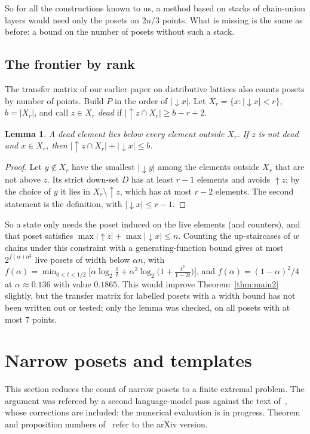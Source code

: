 \documentclass[11pt]{article}
\newtheorem{lemma}[theorem]{Lemma}
\theoremstyle{definition}
\theoremstyle{remark}
\begin{document}
So for all the constructions known to us, a method based on stacks of chain-union layers
would need only the posets on $2n/3$ points. What is missing is the same as before: a bound
on the number of posets without such a stack.

\subsection*{The frontier by rank}

The transfer matrix of our earlier paper on distributive lattices also counts posets by
number of points. Build $P$ in the order of $|{\downarrow}x|$. Let
$X_r=\{x:|{\downarrow}x|<r\}$, $b=|X_r|$, and call $z\in X_r$ \emph{dead} if
$|{\uparrow}z\cap X_r|\ge b-r+2$.

\begin{lemma}
A dead element lies below every element outside $X_r$. If $z$ is not dead and $x\in X_r$,
then $|{\uparrow}z\cap X_r|+|{\downarrow}x|\le b$.
\end{lemma}
\begin{proof}
Let $y\notin X_r$ have the smallest $|{\downarrow}y|$ among the elements outside $X_r$ that
are not above $z$. Its strict down-set $D$ has at least $r-1$ elements and avoids
${\uparrow}z$; by the choice of $y$ it lies in $X_r\setminus{\uparrow}z$, which has at most
$r-2$ elements. The second statement is the definition, with $|{\downarrow}x|\le r-1$.
\end{proof}

So a state only needs the poset induced on the live elements (and counters), and that poset
satisfies $\max|{\uparrow}z|+\max|{\downarrow}x|\le n$. Counting the up-staircases of
$w$ chains under this constraint with a generating-function bound gives at most
$2^{f(\alpha)n^2}$ live posets of width below $\alpha n$, with
$f(\alpha)=\min_{0<t<1/2}\bigl[\alpha\log_2\frac1t
+\alpha^2\log_2\bigl(1+\frac{t^2}{1-2t}\bigr)\bigr]$, and
$f(\alpha)=(1-\alpha)^2/4$ at $\alpha\approx0.136$ with value $0.1865$. This would improve
Theorem~\ref{thm:main2} slightly, but the transfer matrix for labelled posets with a width
bound has not been written out or tested; only the lemma was checked, on all posets with at
most $7$ points.

\section{Narrow posets and templates}

This section reduces the count of narrow posets to a finite extremal problem. The argument
was refereed by a second language-model pass against the text of~\cite{FOU}, whose
corrections are included; the numerical evaluation is in progress. Theorem and proposition
numbers of~\cite{FOU} refer to the arXiv version.
\end{document}
